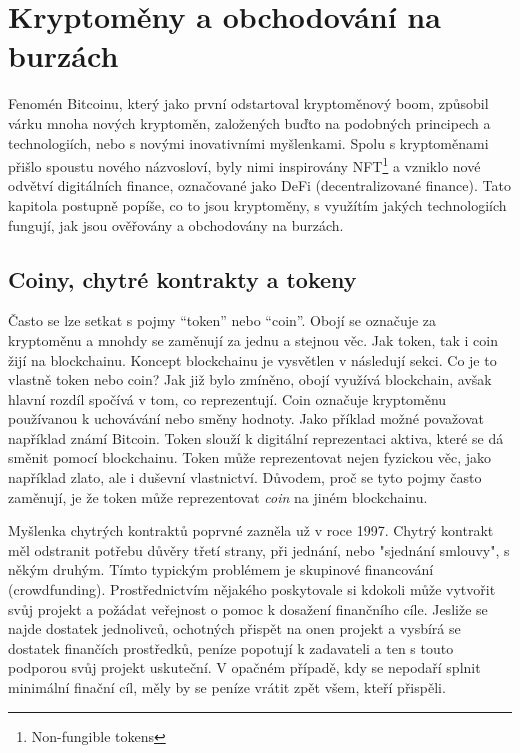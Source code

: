 \chapter{Kryptoměny a obchodování na burzách}
\label{sec:CryptoAndTrading}

Fenomén Bitcoinu, který jako první odstartoval kryptoměnový boom, způsobil várku mnoha nových
kryptoměn, založených buďto na podobných principech a technologiích, nebo s novými inovativními myšlenkami.
Spolu s kryptoměnami přišlo spoustu nového názvosloví, byly nimi inspirovány NFT\footnote{Non-fungible tokens} a vzniklo
nové odvětví digitálních finance, označované jako DeFi (decentralizované finance).
Tato kapitola postupně popíše, co to jsou kryptoměny, s využítím jakých technologiích fungují, jak jsou ověřovány
a obchodovány na burzách.


\section{Coiny, chytré kontrakty a tokeny}
\label{sec:CoinsTokensSmartContracts}
Často se lze setkat s pojmy \enquote{token} nebo \enquote{coin}. Obojí se označuje za kryptoměnu a mnohdy se zaměnují
za jednu a stejnou věc. Jak token, tak i coin žijí na blockchainu.
Koncept blockchainu je vysvětlen v následují sekci. Co je to vlastně token nebo coin? Jak již bylo zmíněno, obojí využívá
blockchain, avšak hlavní rozdíl spočívá v tom, co reprezentují. Coin označuje kryptoměnu používanou k uchovávání
nebo směny hodnoty. Jako příklad možné považovat například známí Bitcoin. Token slouží k digitální reprezentaci
aktiva, které se dá směnit pomocí blockchainu. Token může reprezentovat nejen fyzickou věc, jako například zlato, ale i
duševní vlastnictví. Důvodem, proč se tyto pojmy často zaměnují, je že token může reprezentovat \emph{coin} na jiném blockchainu.

Myšlenka chytrých kontraktů poprvné zazněla už v roce 1997. Chytrý kontrakt měl odstranit potřebu důvěry třetí strany, při
jednání, nebo "sjednání smlouvy", s někým druhým. Tímto typickým problémem je skupinové financování (crowdfunding). Prostřednictvím
nějakého poskytovale si kdokoli může vytvořit svůj projekt a požádat veřejnost o pomoc k dosažení finančního cíle. Jesliže se najde dostatek
jednolivců, ochotných přispět na onen projekt a vysbírá se dostatek finančích prostředků, peníze popotují k zadavateli a ten s touto podporou
svůj projekt uskuteční. V opačném případě, kdy se nepodaří splnit minimální finační cíl, měly by se peníze vrátit zpět všem, kteří přispěli.

